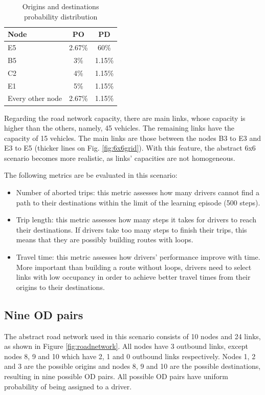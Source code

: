 \documentclass{RITA}
\begin{document}
{%
\begin{table}[ht]
\begin{center}
\begin{tabular}{|l|c|c|} \hline
Node & PO & PD \\ \hline
E5 & 2.67\% & 60\% \\ \hline
B5 & 3\% & 1.15\% \\ \hline
C2 & 4\% & 1.15\% \\ \hline
E1 & 5\% & 1.15\% \\ \hline
Every other node & 2.67\% & 1.15\% \\ \hline
\end{tabular}
\caption{Origins and destinations probability distribution}\label{tab:odprob}
\end{center}
\end{table}
}%
Regarding the road network capacity, there are main links, whose capacity is higher than the others, namely, 45 vehicles. The remaining links have the capacity of 15 vehicles. The main links are those between the nodes B3 to E3 and E3 to E5 (thicker lines on Fig. \ref{fig:6x6grid}). With this feature, the abstract 6x6 scenario becomes more realistic, as links' capacities are not homogeneous.

The following metrics are be evaluated in this scenario:

\begin{itemize}
  \item Number of aborted trips: this metric assesses how many drivers cannot find a path to their destinations within the limit of the learning episode (500 steps).
  \item Trip length: this metric assesses how many steps it takes for drivers to reach their destinations. If drivers take too many steps to finish their trips, this means that they are possibly building routes with loops.
 \item Travel time: this metric assesses how drivers' performance improve with time. More important than building a route without loops, drivers need to select links with low occupancy in order to achieve better travel times from their origins to their destinations.
\end{itemize}

\subsection{Nine OD pairs}
\label{sec:nineODDescription}
The abstract road network used in this scenario consists of 10 nodes and 24 links, as shown in Figure \ref{fig:roadnetwork}. All nodes have 3 outbound links, except nodes 8, 9 and 10 which have 2, 1 and 0 outbound links respectively. Nodes 1, 2 and 3 are the possible origins and nodes 8, 9 and 10 are the possible destinations, resulting in nine possible OD pairs. All possible OD pairs have uniform probability of being assigned to a driver. %
\end{document}
